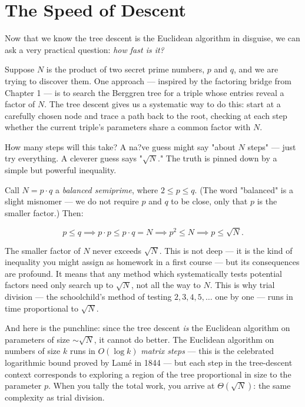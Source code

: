\bigskip


\section{The Speed of Descent}

Now that we know the tree descent is the Euclidean algorithm in disguise, we can ask a very practical question: \textit{how fast is it?}

Suppose $N$ is the product of two secret prime numbers, $p$ and $q$, and we are trying to discover them. One approach --- inspired by the factoring bridge from Chapter 1 --- is to search the Berggren tree for a triple whose entries reveal a factor of $N$. The tree descent gives us a systematic way to do this: start at a carefully chosen node and trace a path back to the root, checking at each step whether the current triple's parameters share a common factor with $N$.

How many steps will this take? A na?ve guess might say "about $N$ steps" --- just try everything. A cleverer guess says "$\sqrt{N}$." The truth is pinned down by a simple but powerful inequality.

Call $N = p \cdot q$ a \textit{balanced semiprime}, where $2 \le p \le q$. (The word "balanced" is a slight misnomer --- we do not require $p$ and $q$ to be close, only that $p$ is the smaller factor.) Then:

\[
p \le q \implies p \cdot p \le p \cdot q = N \implies p^2 \le N \implies p \le \sqrt{N}.
\]

The smaller factor of $N$ never exceeds $\sqrt{N}$. This is not deep --- it is the kind of inequality you might assign as homework in a first course --- but its consequences are profound. It means that any method which systematically tests potential factors need only search up to $\sqrt{N}$, not all the way to $N$. This is why trial division --- the schoolchild's method of testing $2, 3, 4, 5, \ldots$ one by one --- runs in time proportional to $\sqrt{N}$.

And here is the punchline: since the tree descent \textit{is} the Euclidean algorithm on parameters of size $\sim\!\sqrt{N}$, it cannot do better. The Euclidean algorithm on numbers of size $k$ runs in $O(\log k)$ \textit{matrix steps} --- this is the celebrated logarithmic bound proved by Lam\'e in 1844 --- but each step in the tree-descent context corresponds to exploring a region of the tree proportional in size to the parameter $p$. When you tally the total work, you arrive at $\Theta(\sqrt{N})$: the same complexity as trial division.

